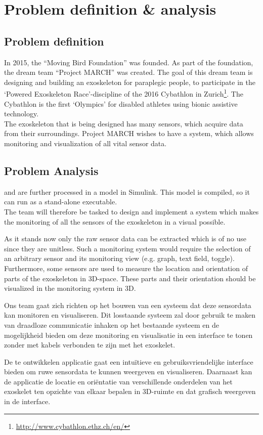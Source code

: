 \section{Problem definition \& analysis}
\subsection{Problem definition}
In 2015, the ``Moving Bird Foundation'' was founded. As part of the foundation, the dream team ``Project MARCH'' was created. The goal of this dream team is designing and building an exoskeleton for paraplegic people, to participate in the `Powered Exoskeleton Race'-discipline of the 2016 Cybathlon in Zurich\footnote{\url{http://www.cybathlon.ethz.ch/en/}}. The Cybathlon is the first `Olympics' for disabled athletes using bionic assistive technology.\\ 
The exoskeleton that is being designed has many sensors, which acquire data from their surroundings. Project MARCH wishes to have a system, which allows monitoring and visualization of all vital sensor data.

\subsection{Problem Analysis}
and are further processed in a model in Simulink. This model is compiled, so it can run as a stand-alone executable.\\
The team will therefore be tasked to design and implement a system which makes the monitoring of all the sensors of the exoskeleton in a visual possible.

As it stands now only the raw sensor data can be extracted which is of no use since they are unitless. Such a monitoring system would require the selection of an arbitrary sensor and its monitoring view (e.g. graph, text field, toggle). Furthermore, some sensors are used to measure the location and orientation of parts of the exoskeleton in 3D-space. These parts and their orientation should be visualized in the monitoring system in 3D.



Ons team gaat zich richten op het bouwen van een systeem dat deze sensordata kan monitoren en visualiseren. Dit losstaande systeem zal door gebruik te maken van draadloze communicatie inhaken op het bestaande systeem en de mogelijkheid bieden om deze monitoring en visualisatie in een interface te tonen zonder met kabels verbonden te zijn met het exoskelet.

De te ontwikkelen applicatie gaat een intuïtieve en gebruiksvriendelijke interface bieden om ruwe sensordata te kunnen weergeven en visualiseren. Daarnaast kan de applicatie de locatie en oriëntatie van verschillende onderdelen van het exoskelet ten opzichte van elkaar bepalen in 3D-ruimte en dat grafisch weergeven in de interface.